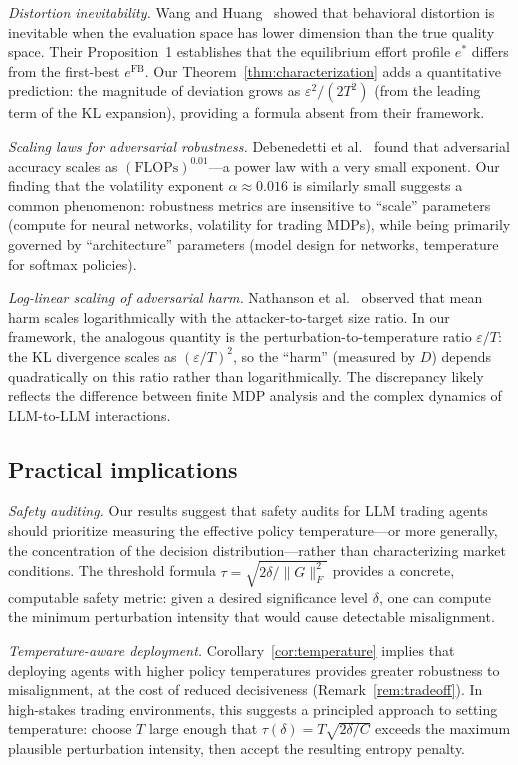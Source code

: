 \emph{Distortion inevitability.}
Wang and Huang~\cite{wang2026reward} showed that behavioral distortion is
inevitable when the evaluation space has lower dimension than the true
quality space. Their Proposition~1 establishes that the equilibrium effort
profile $e^*$ differs from the first-best $e^{\mathrm{FB}}$. Our
Theorem~\ref{thm:characterization} adds a quantitative prediction: the
magnitude of deviation grows as $\varepsilon^2/(2T^2)$ (from the leading
term of the KL expansion), providing a formula absent from their framework.

\emph{Scaling laws for adversarial robustness.}
Debenedetti et al.~\cite{debenedetti2023scaling} found that adversarial
accuracy scales as $(\text{FLOPs})^{0.01}$---a power law with a very small
exponent. Our finding that the volatility exponent $\alpha \approx 0.016$
is similarly small suggests a common phenomenon: robustness metrics are
insensitive to ``scale'' parameters (compute for neural networks, volatility
for trading MDPs), while being primarily governed by ``architecture''
parameters (model design for networks, temperature for softmax policies).

\emph{Log-linear scaling of adversarial harm.}
Nathanson et al.~\cite{nathanson2026scaling} observed that mean harm scales
logarithmically with the attacker-to-target size ratio. In our framework,
the analogous quantity is the perturbation-to-temperature ratio
$\varepsilon/T$: the KL divergence scales as $(\varepsilon/T)^2$, so the
``harm'' (measured by $D$) depends quadratically on this ratio rather than
logarithmically. The discrepancy likely reflects the difference between
finite MDP analysis and the complex dynamics of LLM-to-LLM interactions.

\subsection{Practical implications}

\emph{Safety auditing.}
Our results suggest that safety audits for LLM trading agents should
prioritize measuring the effective policy temperature---or more generally,
the concentration of the decision distribution---rather than characterizing
market conditions. The threshold formula
$\tau = \sqrt{2\delta / \lVert G \rVert_F^2}$ provides a concrete,
computable safety metric: given a desired significance level $\delta$, one
can compute the minimum perturbation intensity that would cause detectable
misalignment.

\emph{Temperature-aware deployment.}
Corollary~\ref{cor:temperature} implies that deploying agents with higher
policy temperatures provides greater robustness to misalignment, at the
cost of reduced decisiveness (Remark~\ref{rem:tradeoff}). In high-stakes
trading environments, this suggests a principled approach to setting
temperature: choose $T$ large enough that $\tau(\delta) = T\sqrt{2\delta/C}$
exceeds the maximum plausible perturbation intensity, then accept the
resulting entropy penalty.

